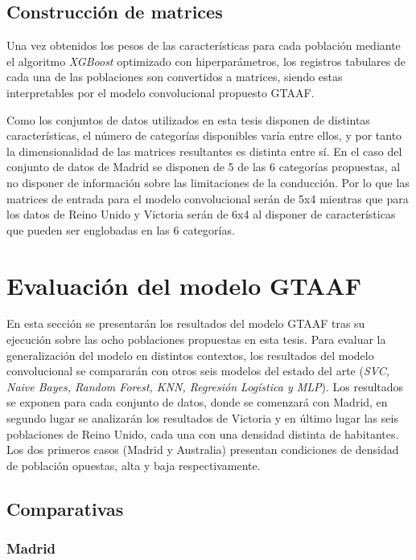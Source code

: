 \subsection{Construcción de matrices}

Una vez obtenidos los pesos de las características para cada población mediante el algoritmo \textit{XGBoost} optimizado con hiperparámetros, los registros tabulares de cada una de las poblaciones son convertidos a matrices, siendo estas interpretables por el modelo convolucional propuesto GTAAF.

Como los conjuntos de datos utilizados en esta tesis disponen de distintas características, el número de categorías disponibles varía entre ellos, y por tanto la dimensionalidad de las matrices resultantes es distinta entre sí. En el caso del conjunto de datos de Madrid se disponen de 5 de las 6 categorías propuestas, al no disponer de información sobre las limitaciones de la conducción. Por lo que las matrices de entrada para el modelo convolucional serán de 5x4 mientras que para los datos de Reino Unido y Victoria serán de 6x4 al disponer de características que pueden ser englobadas en las 6 categorías. 


\section{Evaluación del modelo GTAAF}

En esta sección se presentarán los resultados del modelo GTAAF tras su ejecución sobre las ocho poblaciones propuestas en esta tesis. Para evaluar la generalización del modelo en distintos contextos, los resultados del modelo convolucional se compararán con otros seis modelos del estado del arte (\textit{SVC, Naive Bayes, Random Forest, KNN, Regresión Logística y MLP}). Los resultados se exponen para cada conjunto de datos, donde se comenzará con Madrid, en segundo lugar se analizarán los resultados de Victoria y en último lugar las seis poblaciones de Reino Unido, cada una con una densidad distinta de habitantes. Los dos primeros casos (Madrid y Australia) presentan condiciones de densidad de población opuestas, alta y baja respectivamente.

\subsection{Comparativas}
\subsubsection*{Madrid}

